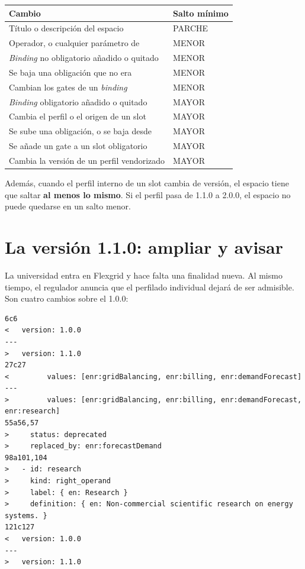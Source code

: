 \begin{longtable}{@{}L{9.4cm}C{2cm}@{}}
\toprule
\textbf{Cambio} & \textbf{Salto mínimo} \\
\midrule
\endhead
Título o descripción del espacio & PARCHE \\
\midrule
Operador,  o cualquier parámetro de  & MENOR \\
\emph{Binding} no obligatorio añadido o quitado & MENOR \\
Se baja una obligación que no era  & MENOR \\
Cambian los gates de un \emph{binding} & MENOR \\
\midrule
\emph{Binding} obligatorio añadido o quitado & MAYOR \\
Cambia el perfil o el origen de un slot & MAYOR \\
Se sube una obligación, o se baja desde  & MAYOR \\
Se añade un gate a un slot obligatorio & MAYOR \\
Cambia la versión de un perfil vendorizado & MAYOR \\
\bottomrule
\end{longtable}

Además, cuando el perfil interno de un slot cambia de versión, el espacio tiene que saltar \textbf{al menos lo
mismo}. Si el perfil pasa de 1.1.0 a 2.0.0, el espacio no puede quedarse en un salto menor.

\section{La versión 1.1.0: ampliar y avisar}

La universidad entra en Flexgrid y hace falta una finalidad nueva. Al mismo tiempo, el regulador anuncia que el
perfilado individual dejará de ser admisible. Son cuatro cambios sobre el 1.0.0:

\begin{lstlisting}[style=out]
6c6
<   version: 1.0.0
---
>   version: 1.1.0
27c27
<         values: [enr:gridBalancing, enr:billing, enr:demandForecast]
---
>         values: [enr:gridBalancing, enr:billing, enr:demandForecast, enr:research]
55a56,57
>     status: deprecated
>     replaced_by: enr:forecastDemand
98a101,104
>   - id: research
>     kind: right_operand
>     label: { en: Research }
>     definition: { en: Non-commercial scientific research on energy systems. }
121c127
<   version: 1.0.0
---
>   version: 1.1.0
\end{lstlisting}

